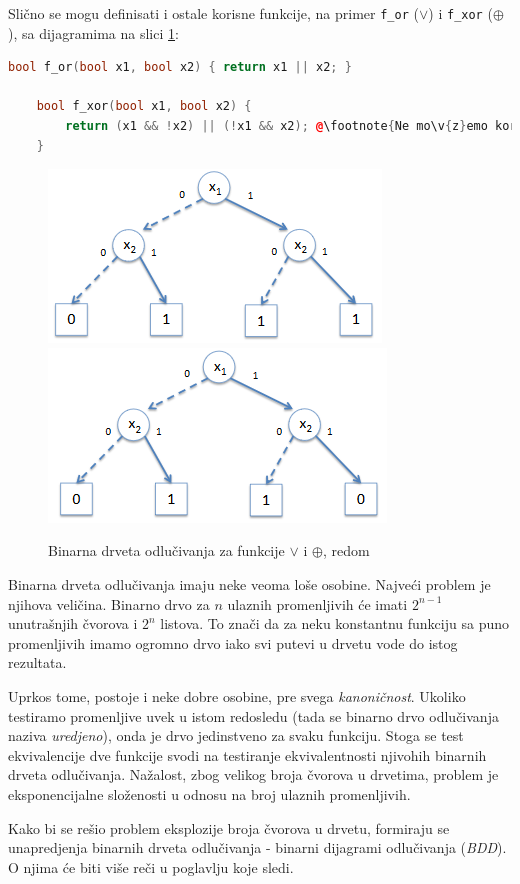 \noindent Sli\v{c}no se mogu definisati i ostale korisne funkcije, na primer \texttt{f\_or} ($\vee$) i \texttt{f\_xor} ($\oplus$), sa dijagramima na slici \ref{fig:BDOrXor}:

\begin{lstlisting}[language=C++,escapechar=@]
    bool f_or(bool x1, bool x2) { return x1 || x2; }

    bool f_xor(bool x1, bool x2) {
        return (x1 && !x2) || (!x1 && x2); @\footnote{Ne mo\v{z}emo koristiti operator \^{} jer on operi\v{s}e nad promenljivima tipa \emph{int}, a ne \emph{bool}.}@
    }
\end{lstlisting}

\begin{figure}[H]
    \includegraphics[scale=0.68]{slike/BD_Or.PNG}
    \includegraphics[scale=0.68]{slike/BD_Xor.PNG}
    \caption{Binarna drveta odlu\v{c}ivanja za funkcije $\vee$ i $\oplus$, redom}
    \label{fig:BDOrXor}
\end{figure}

Binarna drveta odlu\v{c}ivanja imaju neke veoma lo\v{s}e osobine. Najve\'c{}i problem je njihova veli\v{c}ina. Binarno drvo za $n$ ulaznih promenljivih \'c{}e imati $2^{n-1}$ unutra\v{s}njih \v{c}vorova i $2^{n}$ listova. To zna\v{c}i da za neku konstantnu funkciju sa puno promenljivih imamo ogromno drvo iako svi putevi u drvetu vode do istog rezultata.

Uprkos tome, postoje i neke dobre osobine, pre svega \emph{kanoni\v{c}nost}. Ukoliko testiramo promenljive uvek u istom redosledu (tada se binarno drvo odlu\v{c}ivanja naziva \emph{uredjeno}), onda je drvo jedinstveno za svaku funkciju. Stoga se test ekvivalencije dve funkcije svodi na testiranje ekvivalentnosti njivohih binarnih drveta odlu\v{c}ivanja. Na\v{z}alost, zbog velikog broja \v{c}vorova u drvetima, problem je eksponencijalne slo\v{z}enosti u odnosu na broj ulaznih promenljivih.

Kako bi se re\v{s}io problem eksplozije broja \v{c}vorova u drvetu, formiraju se unapredjenja binarnih drveta odlu\v{c}ivanja - binarni dijagrami odlu\v{c}ivanja (\emph{BDD}). O njima \'c{}e biti vi\v{s}e re\v{c}i u poglavlju koje sledi.
